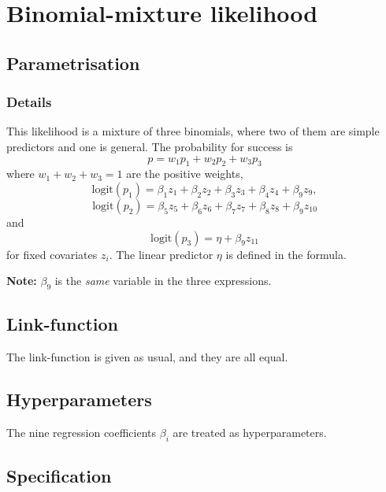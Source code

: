 \documentclass[a4paper,11pt]{article}
\begin{document}
\section*{Binomial-mixture likelihood}

\subsection*{Parametrisation}

\subsubsection*{Details}

This likelihood is a mixture of three binomials, where two of them are
simple predictors and one is general. The probability for success is
\begin{displaymath}
    p = w_1 p_1 + w_2 p_2 + w_3 p_3
\end{displaymath}
where $w_1 + w_2 + w_3 = 1$ are the positive weights,
\begin{displaymath}
    \text{logit}(p_1) = \beta_{1} z_{1} + \beta_{2} z_{2} +
    \beta_{3} z_{3} + \beta_4 z_4 + \beta_9 z_9,
\end{displaymath}
\begin{displaymath}
    \text{logit}(p_2) = \beta_{5} z_{5} +
    \beta_{6} z_{6} + \beta_7 z_7 + \beta_8 z_8 + \beta_9 z_{10}
\end{displaymath}
and
\begin{displaymath}
    \text{logit}(p_3) = \eta + \beta_9 z_{11}
\end{displaymath}
for fixed covariates $z_{i}$.
The linear predictor $\eta$ is defined in the formula.

\textbf{Note:} $\beta_9$ is the \emph{same} variable in the three
expressions.

\subsection*{Link-function}

The link-function is given as usual, and they are all equal.

\subsection*{Hyperparameters}

The nine regression coefficients $\beta_{i}$ are treated as
hyperparameters. 

\subsection*{Specification}
\end{document}
